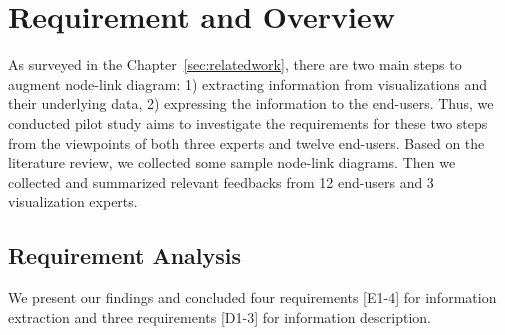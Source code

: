 \section{Requirement and Overview}\label{sec:pilotstudy}


As surveyed in the Chapter~\ref{sec:relatedwork}, there are two main steps to augment node-link diagram: 1) extracting information from visualizations and their underlying data, 2) expressing the information to the end-users. Thus, we conducted pilot study aims to investigate the requirements for these two steps from the viewpoints of both three experts and twelve end-users. 
Based on the literature review, we collected some sample node-link diagrams.
Then we collected and summarized relevant feedbacks from 12 end-users and 3 visualization experts.


\subsection{Requirement Analysis}

We present our findings and concluded four requirements [E1-4] for information extraction and three requirements [D1-3] for information description. 


